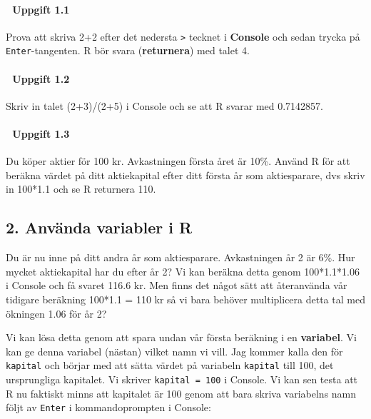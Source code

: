 \documentclass[
  letterpaper,
  DIV=11,
  numbers=noendperiod,
  oneside]{scrartcl}
\let\oldparagraph\paragraph
\renewcommand{\paragraph}[1]{\oldparagraph{#1}\mbox{}}
\begin{document}
\hypertarget{uppgift-1.1}{%
\paragraph{💪 Uppgift 1.1}\label{uppgift-1.1}}

Prova att skriva 2+2 efter det nedersta \texttt{\textgreater{}} tecknet
i \textbf{Console} och sedan trycka på \texttt{Enter}-tangenten. R bör
svara (\textbf{returnera}) med talet 4.

\hypertarget{uppgift-1.2}{%
\paragraph{💪 Uppgift 1.2}\label{uppgift-1.2}}

Skriv in talet (2+3)/(2+5) i Console och se att R svarar med 0.7142857.

\hypertarget{uppgift-1.3}{%
\paragraph{💪 Uppgift 1.3}\label{uppgift-1.3}}

Du köper aktier för 100 kr. Avkastningen första året är 10\%. Använd R
för att beräkna värdet på ditt aktiekapital efter ditt första år som
aktiesparare, dvs skriv in 100*1.1 och se R returnera 110.

\hypertarget{anvuxe4nda-variabler-i-r}{%
\subsection{2. Använda variabler i R}\label{anvuxe4nda-variabler-i-r}}

Du är nu inne på ditt andra år som aktiesparare. Avkastningen år 2 är
6\%. Hur mycket aktiekapital har du efter år 2? Vi kan beräkna detta
genom 100*1.1*1.06 i Console och få svaret 116.6 kr. Men finns det något
sätt att återanvända vår tidigare beräkning 100*1.1 = 110 kr så vi bara
behöver multiplicera detta tal med ökningen 1.06 för år 2?

Vi kan lösa detta genom att spara undan vår första beräkning i en
\textbf{variabel}. Vi kan ge denna variabel (nästan) vilket namn vi
vill. Jag kommer kalla den för \texttt{kapital} och börjar med att sätta
värdet på variabeln \texttt{kapital} till 100, det ursprungliga
kapitalet. Vi skriver \texttt{kapital\ =\ 100} i Console. Vi kan sen
testa att R nu faktiskt minns att kapitalet är 100 genom att bara skriva
variabelns namn följt av \texttt{Enter} i kommandoprompten i Console:
\end{document}
